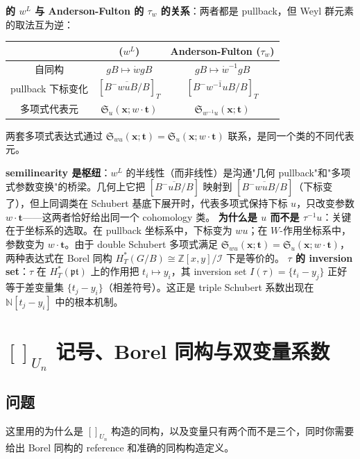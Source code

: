 \textbf{\cite{GX2025} 的 $w^L$ 与 Anderson-Fulton 的 $\tau_w$ 的关系}：两者都是 pullback，但 Weyl 群元素的取法互为逆：
\begin{center}
\begin{tabular}{c|c|c}
\hline
 & \cite{GX2025} ($w^L$) & Anderson-Fulton ($\tau_w$) \\ \hline
自同构 & $gB \mapsto \dot{w}gB$ & $gB \mapsto \dot{w}^{-1}gB$ \\ \hline
pullback 下标变化 & $[\overline{B^-wuB/B}]_T$ & $[\overline{B^-w^{-1}uB/B}]_T$ \\ \hline
多项式代表元 & $\mathfrak{S}_u(\mathbf{x};w\cdot\mathbf{t})$ & $\mathfrak{S}_{w^{-1}u}(\mathbf{x};\mathbf{t})$ \\ \hline
\end{tabular}
\end{center}
两套多项式表达式通过 $\mathfrak{S}_{wu}(\mathbf{x};\mathbf{t}) = \mathfrak{S}_u(\mathbf{x};w\cdot\mathbf{t})$ 联系，是同一个类的不同代表元。

\begin{insight}
\textbf{semilinearity 是枢纽}：$w^L$ 的半线性（而非线性）是沟通"几何 pullback"和"多项式参数变换"的桥梁。几何上它把 $[\overline{B^-uB/B}]$ 映射到 $[\overline{B^-wuB/B}]$（下标变了），但上同调类在 Schubert 基底下展开时，代表多项式保持下标 $u$，只改变参数 $w\cdot\mathbf{t}$——这两者恰好给出同一个 cohomology 类。
\textbf{为什么是 $u$ 而不是 $\tau^{-1}u$}：关键在于坐标系的选取。在 pullback 坐标系中，下标变为 $wu$；在 $W$-作用坐标系中，参数变为 $w\cdot\mathbf{t}$。由于 double Schubert 多项式满足 $\mathfrak{S}_{wu}(\mathbf{x};\mathbf{t}) = \mathfrak{S}_u(\mathbf{x};w\cdot\mathbf{t})$，两种表达式在 Borel 同构 $H_T^*(G/B) \cong \mathbb{Z}[x,y]/\mathcal{I}$ 下是等价的。
\textbf{$\tau$ 的 inversion set}：$\tau$ 在 $H_T^*(\mathfrak{pt})$ 上的作用把 $t_i \mapsto y_i$，其 inversion set $I(\tau) = \{t_i - y_j\}$ 正好等于差变量集 $\{t_j - y_i\}$（相差符号）。这正是 triple Schubert 系数出现在 $\mathbb{N}[t_j - y_i]$ 中的根本机制。
\end{insight}


\section{$[ ]_{U_n}$ 记号、Borel 同构与双变量系数}\label{sec:qa-Borel-U-n-construction}
\subsection{问题}这里用的为什么是 $[ ]_{U_n}$ 构造的同构，以及变量只有两个而不是三个，同时你需要给出 Borel 同构的 reference 和准确的同构构造定义。

